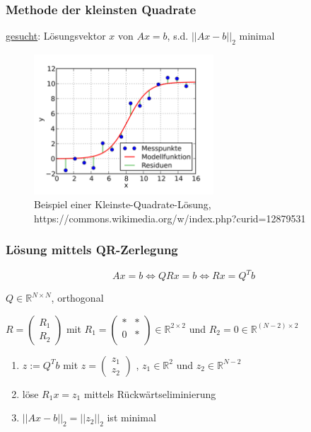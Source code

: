 \documentclass{beamer}
\begin{document}
\begin{frame} %
  \frametitle{Methode der kleinsten Quadrate} %
  \underline{gesucht}: Lösungsvektor $x$ von $Ax=b$, s.d. $||Ax-b||_2$ minimal
  \begin{figure}
    \centering
      \includegraphics[width=0.6\textwidth]{least_squares_example}
    \caption{Beispiel einer Kleinste-Quadrate-Lösung, https://commons.wikimedia.org/w/index.php?curid=12879531}
  \end{figure}
\end{frame}

\begin{frame} %
  \frametitle{Lösung mittels QR-Zerlegung} %
  \begin{equation*}
    Ax = b \iff QRx = b \iff Rx = Q^T b
  \end{equation*}
\bigskip

\centering
  $Q \in \mathbb{R}^{N\times N}$, orthogonal
\bigskip

  $R=
    \begin{pmatrix}
      R_1 \\
      R_2
    \end{pmatrix}$
  mit
  $R_1=
  \begin{pmatrix}
    *     & * \\
    0     & *\\
  \end{pmatrix} \in \mathbb{R}^{2\times 2}$
  und
  $R_2=0  \in \mathbb{R}^{(N-2)\times 2}$

\pause
\bigskip

  \begin{enumerate}
    \item $z := Q^T b$ mit
    $z =
    \begin{pmatrix}
      z_1 \\
      z_2
    \end{pmatrix}$
    , $z_1 \in \mathbb{R}^{2}$ und $z_2 \in \mathbb{R}^{N-2}$
    \pause
    \item löse $R_1 x = z_1$ mittels Rückwärtseliminierung
    \pause
    \item $||Ax-b||_2 = ||z_2||_2$ ist minimal
  \end{enumerate}
\end{frame}
\end{document}
